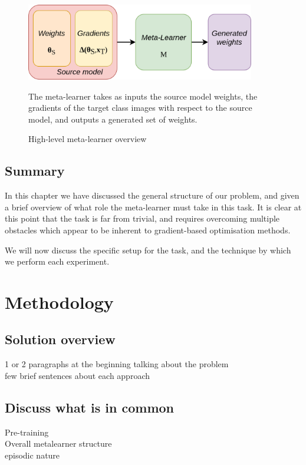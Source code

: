\documentclass{report}
\begin{document}
\begin{figure}[!h]
 \centering
 \includegraphics[width=10cm]{ml-highlevel-overview}
 \caption{High-level meta-learner overview}
 The meta-learner takes as inputs the source model weights, the gradients of the target class images with respect to the source model, and outputs a generated set of weights.
 \label{fig:metalearnersimple:1}
\end{figure}

\section{Summary}
In this chapter we have discussed the general structure of our problem, and given a brief overview of what role the meta-learner must take in this task. It is clear at this point that the task is far from trivial, and requires overcoming multiple obstacles which appear to be inherent to gradient-based optimisation methods. \par
We will now discuss the specific setup for the task, and the technique by which we perform each experiment. \\


\chapter{Methodology}

\section{Solution overview}
1 or 2 paragraphs at the beginning talking about the problem \\
few brief sentences about each approach \\

\section{Discuss what is in common} \label{commonalities}
Pre-training \\
Overall metalearner structure \\
episodic nature \\
\end{document}
